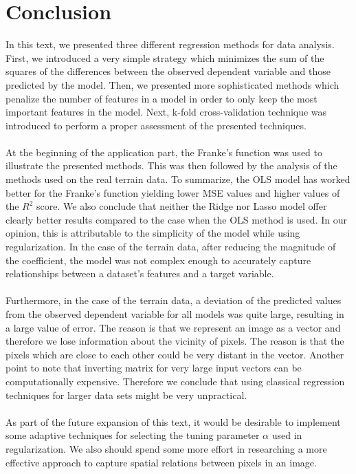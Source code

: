 \documentclass [11pt]{article}
\begin{document}
\section*{Conclusion}
In this text, we presented three different regression methods for data analysis. First, we introduced a very simple strategy which minimizes the sum of the squares of the differences between the observed dependent variable and those predicted by the model. Then, we presented more sophisticated methods which penalize the number of features in a model in order to only keep the most important features in the model. Next, k-fold cross-validation technique was introduced to perform a proper assessment of the presented techniques.\\
\\
At the beginning of the application part, the Franke's function was used to illustrate the presented methods. This was then followed by the analysis of the methods used on the real terrain data. To summarize, the OLS model has worked better for the Franke's function yielding lower MSE values and higher values of the $R^{2}$ score. We also conclude that neither the Ridge nor Lasso model offer clearly better results compared to the case when the OLS method is used. In our opinion, this is attributable to the simplicity of the model while using regularization. In the case of the terrain data, after reducing the magnitude of the coefficient, the model was not complex enough to accurately capture relationships between a dataset’s features and a target variable.  \\
\\
Furthermore, in the case of the terrain data, a deviation of the predicted values from the observed dependent variable for all models was quite large, resulting in a large value of error. The reason is that we represent an image as a vector and therefore we lose information about the vicinity of pixels. The reason is that the pixels which are close to each other could be very distant in the vector. Another point to note that inverting matrix for very large input vectors can be computationally expensive. Therefore we conclude that using classical regression techniques for larger data sets might be very unpractical.\\
\\
As part of the future expansion of this text, it would be desirable to implement some adaptive techniques for selecting the tuning parameter $\alpha$ used in regularization. We also should spend some more effort in researching a more effective approach to capture spatial relations between pixels in an image.
\end{document}
